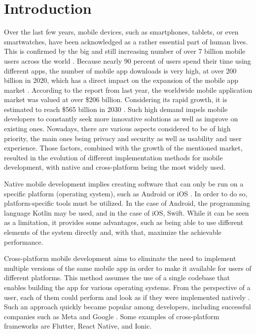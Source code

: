
\chapter{Introduction}

Over the last few years, mobile devices, such as smartphones, tablets, or even smartwatches, have been acknowledged as a rather essential part of human lives. This is confirmed by the big and still increasing number of over 7 billion mobile users across the world \cite{statista_mobile_users_worldwide}. Because nearly 90 percent of users spend their time using different apps, the number of mobile app downloads is very high, at over 200 billion in 2020, which has a direct impact on the expansion of the mobile app market \cite{techjury_app_statistics}. According to the report from last year, the worldwide mobile application market was valued at over \$206 billion. Considering its rapid growth, it is estimated to reach \$565 billion in 2030 \cite{mobile_market_size}. Such high demand impels mobile developers to constantly seek more innovative solutions as well as improve on existing ones. Nowadays, there are various aspects considered to be of high priority, the main ones being privacy and security as well as usability and user experience. Those factors, combined with the growth of the mentioned market, resulted in the evolution of different implementation methods for mobile development, with native and cross-platform being the most widely used.

Native mobile development implies creating software that can only be run on a specific platform (operating system), such as Android or iOS \cite{cma_mobile_ecosystems_report}. In order to do so, platform-specific tools must be utilized. In the case of Android, the programming language Kotlin may be used, and in the case of iOS, Swift. While it can be seen as a limitation, it provides some advantages, such as being able to use different elements of the system directly and, with that, maximize the achievable performance.

Cross-platform mobile development aims to eliminate the need to implement multiple versions of the same mobile app in order to make it available for users of different platforms. This method assumes the use of a single codebase that enables building the app for various operating systems. From the perspective of a user, each of them could perform and look as if they were implemented natively \cite{lachgar_mcdm_cp}. Such an approach quickly became popular among developers, including successful companies such as Meta and Google \cite{kotlin_popular_cross_platform_frameworks}. Some examples of cross-platform frameworks are Flutter, React Native, and Ionic.

